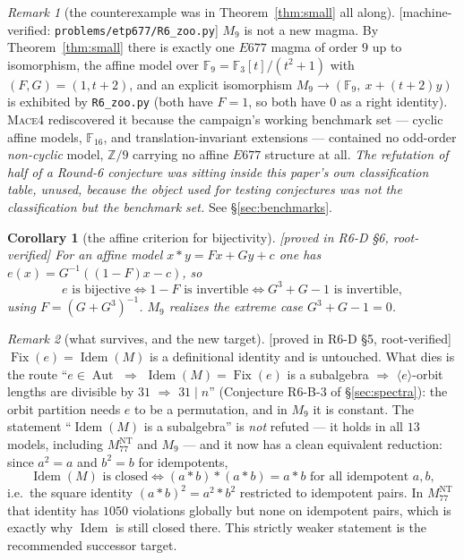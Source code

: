 \documentclass[11pt]{article}
\theoremstyle{plain}
\newtheorem{corollary}[theorem]{Corollary}
\theoremstyle{definition}
\theoremstyle{remark}
\newtheorem*{remark*}{Remark}
\numberwithin{equation}{section}
\newcommand{\Z}{\mathbb{Z}}
\newcommand{\F}{\mathbb{F}}
\newcommand{\op}{\mathbin{*}}
\newcommand{\Fix}{\operatorname{Fix}}
\newcommand{\Aut}{\operatorname{Aut}}
\newcommand{\Idem}{\operatorname{Idem}}
\newcommand{\statusbox}[1]{{\small\sloppy\textsf{[#1]}}}
\newcommand{\MV}[1]{\statusbox{machine-verified: \texttt{#1}}}
\newcommand{\PROVED}[1]{\statusbox{proved in #1, root-verified}}
\newcommand{\COMP}[1]{\statusbox{computational: #1}}
\begin{document}
\begin{remark*}[the counterexample was in Theorem~\ref{thm:small} all along]
\MV{problems\slash etp677\slash R6\_zoo.py}
$M_9$ is not a new magma. By Theorem~\ref{thm:small} there is exactly one $E677$
magma of order $9$ up to isomorphism, the affine model over
$\F_9 = \F_3[t]/(t^2+1)$ with $(F,G) = (1,t+2)$, and an explicit isomorphism
$M_9\to(\F_9,\ x+(t+2)y)$ is exhibited by \texttt{R6\_zoo.py} (both have $F = 1$,
so both have $0$ as a right identity). \textsc{Mace4} rediscovered it because the
campaign's working benchmark set --- cyclic affine models, $\F_{16}$, and
translation-invariant extensions --- contained no odd-order \emph{non-cyclic}
model, $\Z/9$ carrying no affine $E677$ structure at all. \emph{The refutation of
half of a Round-6 conjecture was sitting inside this paper's own classification
table, unused, because the object used for testing conjectures was not the
classification but the benchmark set.} See \S\ref{sec:benchmarks}.
\end{remark*}

\begin{corollary}[the affine criterion for bijectivity]\label{cor:affe}
\PROVED{R6-D \S6}
For an affine model $x\op y = Fx+Gy+c$ one has $e(x) = G^{-1}((1-F)x-c)$, so
\[
  e \text{ is bijective} \iff 1-F \text{ is invertible} \iff G^3+G-1 \text{ is
  invertible},
\]
using $F = (G+G^3)^{-1}$. $M_9$ realizes the extreme case $G^3+G-1 = 0$.
\end{corollary}

\begin{remark*}[what survives, and the new target]
\PROVED{R6-D \S5}\;\COMP{$13$ models; root-verified}
$\Fix(e) = \Idem(M)$ is a definitional identity and is untouched. What dies is the
route ``$e\in\Aut$ $\Rightarrow$ $\Idem(M) = \Fix(e)$ is a subalgebra
$\Rightarrow$ $\langle e\rangle$-orbit lengths are divisible by $31$
$\Rightarrow$ $31\mid n$'' (Conjecture R6-B-3 of \S\ref{sec:spectra}): the orbit
partition needs $e$ to be a permutation, and in $M_9$ it is constant. The
statement ``$\Idem(M)$ is a subalgebra'' is \emph{not} refuted --- it holds in all
$13$ models, including $M_{77}^{\mathrm{NT}}$ and $M_9$ --- and it now has a clean
equivalent reduction: since $a^2 = a$ and $b^2 = b$ for idempotents,
\[
  \Idem(M) \text{ is closed} \iff (a\op b)\op(a\op b) = a\op b
  \text{ for all idempotent } a,b,
\]
i.e.\ the square identity $(a\op b)^2 = a^2\op b^2$ restricted to idempotent
pairs. In $M_{77}^{\mathrm{NT}}$ that identity has $1050$ violations globally but
none on idempotent pairs, which is exactly why $\Idem$ is still closed there. This
strictly weaker statement is the recommended successor target.
\end{remark*}
\end{document}
